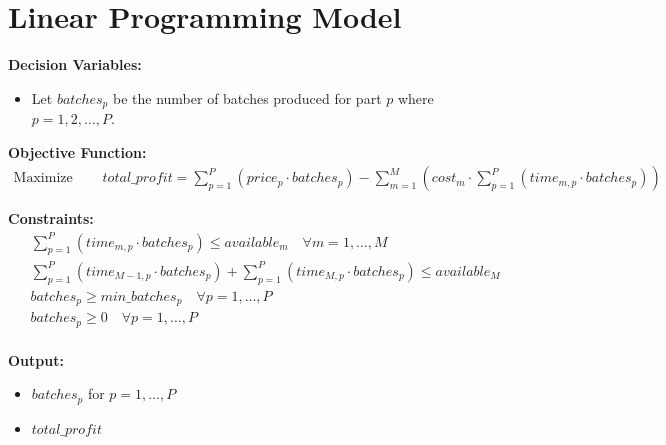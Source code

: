 \documentclass{article}
\begin{document}
\section*{Linear Programming Model}

\textbf{Decision Variables:}
\begin{itemize}
    \item Let \( batches_p \) be the number of batches produced for part \( p \) where \( p = 1, 2, \ldots, P \).
\end{itemize}

\textbf{Objective Function:}
\begin{align*}
    \text{Maximize } & \quad total\_profit = \sum_{p=1}^{P} (price_p \cdot batches_p) - \sum_{m=1}^{M} (cost_m \cdot \sum_{p=1}^{P} (time_{m,p} \cdot batches_p))
\end{align*}

\textbf{Constraints:}
\begin{align*}
    & \sum_{p=1}^{P} (time_{m,p} \cdot batches_p) \leq available_m \quad \forall m = 1, \ldots, M \\
    & \sum_{p=1}^{P} (time_{M-1,p} \cdot batches_p) + \sum_{p=1}^{P} (time_{M,p} \cdot batches_p) \leq available_M \\
    & batches_p \geq min\_batches_p \quad \forall p = 1, \ldots, P \\
    & batches_p \geq 0 \quad \forall p = 1, \ldots, P \\
\end{align*}

\textbf{Output:}
\begin{itemize}
    \item \( batches_p \) for \( p = 1, \ldots, P \)
    \item \( total\_profit \)
\end{itemize}
\end{document}
